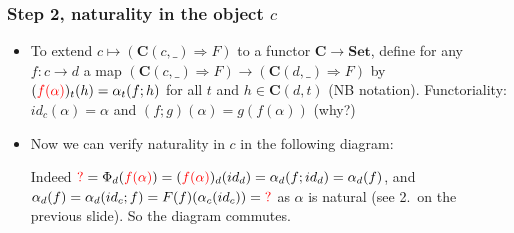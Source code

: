 \documentclass[handout]{beamer}
\newcommand{\To}{\Rightarrow}
\newcommand{\bfsf}[1]{{\boldsymbol{#1}}}
\newcommand{\Set}{\bfsf{Set}}
\newcommand{\CC}{\bfsf{C}}
\begin{document}
\frame
  {   
    \frametitle{Step 2, naturality in the object $c$}\label{Yon:natural_in_c}

 \begin{itemize}[<+->]
\item To extend $c\mapsto(\CC(c,\_)\To F)$ to a functor $\CC\to\Set$, define
for any $f:c\to d$ a map $(\CC(c,\_)\To F)\to(\CC(d,\_)\To F)$ by
$({\color{red}f(\alpha)})_t (h) = \alpha_t(f;h)$ for all $t$ and $h\in\CC(d,t)$ 
(NB {\color{red}notation}).
Functoriality: $id_c(\alpha) = \alpha$ and $(f;g)(\alpha) = g(f(\alpha))$ (why?)
\item Now we can verify naturality in $c$ in the following diagram:

Indeed ${\color{red} ?}=\Phi_d({\color{red}f(\alpha)}) = ({\color{red}f(\alpha)})_d(id_d) = \alpha_d(f;id_d)=\alpha_d(f)$,
and $\alpha_d(f)=\alpha_d(id_c;f)=F(f)(\alpha_c(id_c))={\color{red} ?}$ 
as $\alpha$ is natural (see 2.\ on the previous slide). So the diagram commutes.
 \end{itemize}

 }
\end{document}
